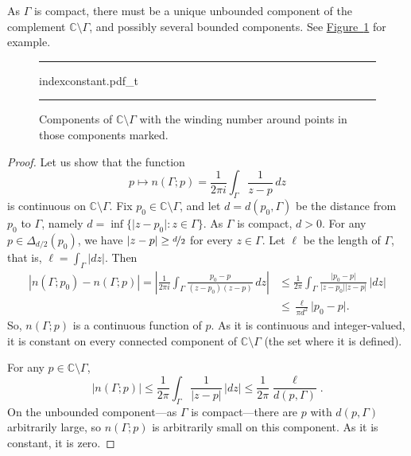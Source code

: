 \documentclass[12pt,openany]{book}
\newcommand{\sabs}[1]{\lvert {#1} \rvert}
\newcommand{\abs}[1]{\left\lvert {#1} \right\rvert}
\newcommand{\C}{{\mathbb{C}}}
\theoremstyle{plain}
\theoremstyle{remark}
\theoremstyle{definition}
\newenvironment{myfig}{%
\begin{figure}[h!t]
\noindent\rule{\textwidth}{0.5pt}\vspace{12pt}\par\centering}%
{\par\noindent\rule{\textwidth}{0.5pt}
\end{figure}}
\theoremstyle{exercise}
\theoremstyle{example}
\newcommand{\figureref}[1]{\hyperref[#1]{Figure~\ref*{#1}}}
\begin{document}
As $\Gamma$ is compact, there must be a unique unbounded component
of the complement $\C \setminus \Gamma$, and possibly several bounded
components.
See \figureref{fig:indexconstant} for example.

\begin{myfig}
{indexconstant.pdf_t}
\caption{Components of $\C \setminus \Gamma$ with the 
winding number around points in those components
marked.\label{fig:indexconstant}}
\end{myfig}

\begin{proof}
Let us show that the function
\begin{equation*}
p \mapsto n(\Gamma;p) = \frac{1}{2\pi i} \int_\Gamma \frac{1}{z-p} \, dz
\end{equation*}
is continuous on $\C \setminus \Gamma$.
Fix $p_0 \in \C \setminus \Gamma$, and let
%
$d = d(p_0,\Gamma)$ be the
distance from 
$p_0$ to $\Gamma$, namely
$d = \inf \bigl\{ \sabs{z-p_0} : z \in \Gamma \bigr\}$.
As $\Gamma$ is compact, $d > 0$.  
For any $p \in \Delta_{d/2}(p_0)$, we have $\sabs{z-p} \geq
\nicefrac{d}{2}$ for every $z \in \Gamma$.  Let $\ell$ be the length of
$\Gamma$, that is, $\ell = \int_\Gamma \sabs{dz}$.  Then
\begin{equation*}
\begin{split}
\abs{n(\Gamma;p_0)-n(\Gamma;p)}
=
\abs{\frac{1}{2\pi i} \int_\Gamma \frac{p_0-p}{(z-p_0)(z-p)} \, dz}
& \leq
\frac{1}{2\pi} \int_\Gamma \frac{\sabs{p_0-p}}{\sabs{z-p_0}\sabs{z-p}} \, \sabs{dz}
\\
& \leq 
\frac{\ell}{\pi {d}^2} \sabs{p_0-p} .
\end{split}
\end{equation*}
So, $n(\Gamma;p)$ is a continuous function of $p$.
As it is continuous
and integer-valued, it is constant on every connected component of
$\C \setminus \Gamma$ (the set where it is defined).

For any $p \in \C \setminus \Gamma$,
\begin{equation*}
\sabs{n(\Gamma;p)} \leq \frac{1}{2\pi} \int_\Gamma \frac{1}{\sabs{z-p}} \,
\sabs{dz} \leq \frac{1}{2\pi} \frac{\ell}{d(p,\Gamma)} .
\end{equation*}
On the unbounded component---as $\Gamma$ is compact---there are $p$
with $d(p,\Gamma)$ arbitrarily large, so $n(\Gamma;p)$ is arbitrarily small
on this component.  As it is constant, it is zero.
\end{proof}
\end{document}
